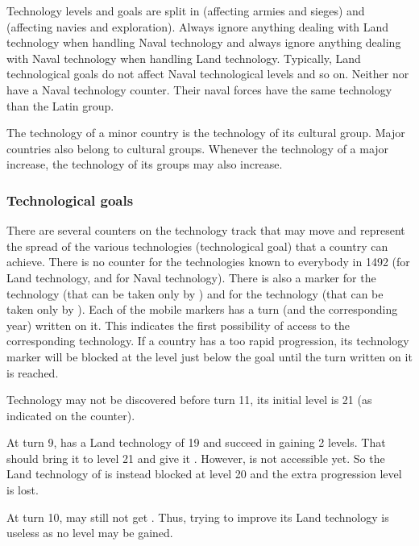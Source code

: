  Technology levels and goals are split in  (affecting armies and sieges) and 
(affecting navies and exploration).
\bparag Always ignore anything dealing with Land technology when handling
Naval technology and always ignore anything dealing with Naval technology when
handling Land technology. Typically, Land technological goals do not affect
Naval technological levels and so on.
\bparag Neither \AUT nor \PRU have a Naval technology counter. Their naval
forces have the same technology than the Latin group.

 The technology of a minor country is the technology
of its cultural group.
\bparag Major countries also belong to cultural groups. Whenever the
technology of a major increase, the technology of its groups may also
increase.


\subsubsection{Technological goals}
 There are several counters on the technology track
that may move and represent the spread of the various technologies
(technological goal) that a country can achieve. There is no counter for the
technologies known to everybody in 1492 (\TMED for Land technology, \TCAR and
\TGA for Naval technology).
\bparag There is also a marker for the \TTER technology (that can be taken
only by \SPA) and for the \TVGA technology (that can be taken only by \VEN).
\bparag Each of the mobile markers has a turn (and the corresponding year)
written on it. This indicates the first possibility of access to the
corresponding technology.
\bparag If a country has a too rapid progression, its technology marker will
be blocked at the level just below the goal until the turn written on it is
reached.

\begin{exemple}
  Technology \TARQ may not be discovered before turn 11, its initial level is
  21 (as indicated on the counter).

  At turn 9, \FRA has a Land technology of 19 and succeed in gaining 2
  levels. That should bring it to level 21 and give it \TARQ. However, \TARQ
  is not accessible yet. So the Land technology of \FRA is instead blocked at
  level 20 and the extra progression level is lost.

  At turn 10, \FRA may still not get \TARQ. Thus, trying to improve its Land
  technology is useless as no level may be gained.
\end{exemple}

